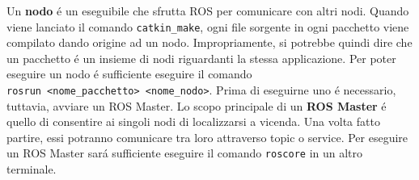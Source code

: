 Un \textbf{nodo} \'{e} un eseguibile che sfrutta ROS per comunicare con altri nodi.
Quando viene lanciato il comando \verb|catkin_make|, ogni file sorgente in ogni pacchetto viene compilato 
dando origine ad un nodo.
Impropriamente, si potrebbe quindi dire che un pacchetto \'{e} un insieme di nodi riguardanti la stessa applicazione.
Per poter eseguire un nodo \'{e} sufficiente eseguire il comando \\
\verb|rosrun <nome_pacchetto> <nome_nodo>|. 
Prima di eseguirne uno \'{e} necessario, tuttavia, avviare un ROS Master.
Lo scopo principale di un \textbf{ROS Master} \'{e} quello di consentire ai singoli nodi di localizzarsi a vicenda. Una volta 
fatto partire, essi potranno comunicare tra loro attraverso topic o service.
Per eseguire un ROS Master sar\'{a} sufficiente eseguire il comando \verb|roscore| in un altro terminale.
